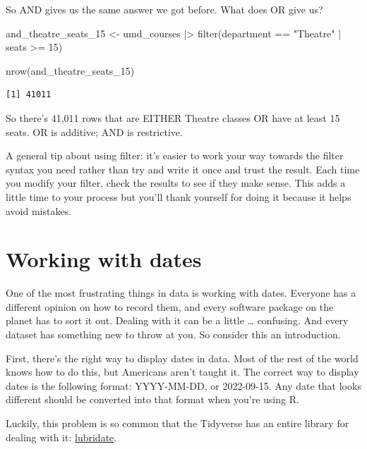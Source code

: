 \documentclass[
  letterpaper,
  DIV=11,
  numbers=noendperiod]{scrreprt}
\newenvironment{Shaded}{\begin{snugshade}}{\end{snugshade}}
\newcommand{\DecValTok}[1]{\textcolor[rgb]{0.68,0.00,0.00}{#1}}
\newcommand{\FunctionTok}[1]{\textcolor[rgb]{0.28,0.35,0.67}{#1}}
\newcommand{\NormalTok}[1]{\textcolor[rgb]{0.00,0.23,0.31}{#1}}
\newcommand{\OtherTok}[1]{\textcolor[rgb]{0.00,0.23,0.31}{#1}}
\newcommand{\SpecialCharTok}[1]{\textcolor[rgb]{0.37,0.37,0.37}{#1}}
\newcommand{\StringTok}[1]{\textcolor[rgb]{0.13,0.47,0.30}{#1}}
\begin{document}
So AND gives us the same answer we got before. What does OR give us?

\begin{Shaded}
\begin{Highlighting}[]
\NormalTok{and\_theatre\_seats\_15 }\OtherTok{\textless{}{-}}\NormalTok{ umd\_courses }\SpecialCharTok{|\textgreater{}} \FunctionTok{filter}\NormalTok{(department }\SpecialCharTok{==} \StringTok{"Theatre"} \SpecialCharTok{|}\NormalTok{ seats }\SpecialCharTok{\textgreater{}=} \DecValTok{15}\NormalTok{)}

\FunctionTok{nrow}\NormalTok{(and\_theatre\_seats\_15)}
\end{Highlighting}
\end{Shaded}

\begin{verbatim}
[1] 41011
\end{verbatim}

So there's 41,011 rows that are EITHER Theatre classes OR have at least
15 seats. OR is additive; AND is restrictive.

A general tip about using filter: it's easier to work your way towards
the filter syntax you need rather than try and write it once and trust
the result. Each time you modify your filter, check the results to see
if they make sense. This adds a little time to your process but you'll
thank yourself for doing it because it helps avoid mistakes.


\hypertarget{working-with-dates}{%
\chapter{Working with dates}\label{working-with-dates}}

One of the most frustrating things in data is working with dates.
Everyone has a different opinion on how to record them, and every
software package on the planet has to sort it out. Dealing with it can
be a little \ldots{} confusing. And every dataset has something new to
throw at you. So consider this an introduction.

First, there's the right way to display dates in data. Most of the rest
of the world knows how to do this, but Americans aren't taught it. The
correct way to display dates is the following format: YYYY-MM-DD, or
2022-09-15. Any date that looks different should be converted into that
format when you're using R.

Luckily, this problem is so common that the Tidyverse has an entire
library for dealing with it:
\href{https://lubridate.tidyverse.org/}{lubridate}.
\end{document}
